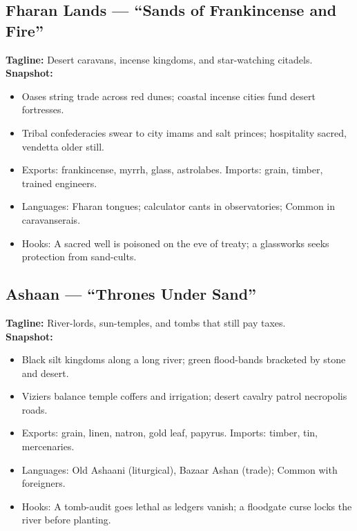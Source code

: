 \documentclass[11pt]{article}
\begin{document}
\subsection*{Fharan Lands — “Sands of Frankincense and Fire”}
\textbf{Tagline:} Desert caravans, incense kingdoms, and star-watching citadels.\\
\textbf{Snapshot:}
\begin{itemize}
  \item Oases string trade across red dunes; coastal incense cities fund desert fortresses.
  \item Tribal confederacies swear to city imams and salt princes; hospitality sacred, vendetta older still.
  \item Exports: frankincense, myrrh, glass, astrolabes. Imports: grain, timber, trained engineers.
  \item Languages: Fharan tongues; calculator cants in observatories; Common in caravanserais.
  \item Hooks: A sacred well is poisoned on the eve of treaty; a glassworks seeks protection from sand-cults.
\end{itemize}

\subsection*{Ashaan — “Thrones Under Sand”}
\textbf{Tagline:} River-lords, sun-temples, and tombs that still pay taxes.\\
\textbf{Snapshot:}
\begin{itemize}
  \item Black silt kingdoms along a long river; green flood-bands bracketed by stone and desert.
  \item Viziers balance temple coffers and irrigation; desert cavalry patrol necropolis roads.
  \item Exports: grain, linen, natron, gold leaf, papyrus. Imports: timber, tin, mercenaries.
  \item Languages: Old Ashaani (liturgical), Bazaar Ashan (trade); Common with foreigners.
  \item Hooks: A tomb-audit goes lethal as ledgers vanish; a floodgate curse locks the river before planting.
\end{itemize}
\end{document}
